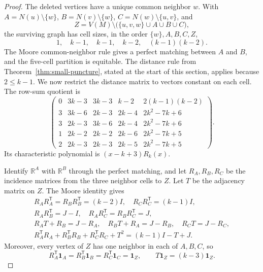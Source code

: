 \documentclass[a4paper,10pt,reqno]{amsart}
\theoremstyle{plain}
\theoremstyle{definition}
\theoremstyle{remark}
\newcommand{\one}{\mathbf 1}
\begin{document}
\begin{proof}
The deleted vertices have a unique common neighbor \(w\).  With
\(A=N(u)\setminus\{w\}\), \(B=N(v)\setminus\{w\}\),
\(C=N(w)\setminus\{u,v\}\), and
\[
 Z=V(M)\setminus\bigl(\{u,v,w\}\cup A\cup B\cup C\bigr),
\]
the surviving graph has cell sizes, in the order \(\{w\},A,B,C,Z\),
\[
 1,\quad k-1,\quad k-1,\quad k-2,\quad (k-1)(k-2).
\]
The Moore common-neighbor rule gives a perfect matching between
\(A\) and \(B\), and the five-cell partition is equitable.
The distance rule from Theorem~\ref{thm:small-puncture}, stated at the
start of this section, applies because \(2\le k-1\).
We now restrict the distance matrix to vectors constant on each cell.
The row-sum quotient is
\[
\begin{pmatrix}
0&3k-3&3k-3&k-2&2(k-1)(k-2)\\
3&3k-6&2k-3&2k-4&2k^2-7k+6\\
3&2k-3&3k-6&2k-4&2k^2-7k+6\\
1&2k-2&2k-2&2k-6&2k^2-7k+5\\
2&2k-3&2k-3&2k-5&2k^2-7k+5
\end{pmatrix}.
\]
Its characteristic polynomial is \((x-k+3)R_k(x)\).

Identify \(\mathbb R^A\) with \(\mathbb R^B\) through the perfect matching,
and let \(R_A,R_B,R_C\) be the incidence matrices from the three
neighbor cells to \(Z\).  Let \(T\) be the adjacency matrix on \(Z\).
The Moore identity gives
\[
\begin{gathered}
R_AR_A^{\mathsf T}=R_BR_B^{\mathsf T}=(k-2)I,\quad
R_CR_C^{\mathsf T}=(k-1)I,\\
R_AR_B^{\mathsf T}=J-I,\quad
R_AR_C^{\mathsf T}=R_BR_C^{\mathsf T}=J,\\
R_AT+R_B=J-R_A,\quad
R_BT+R_A=J-R_B,\quad
R_CT=J-R_C,\\
R_A^{\mathsf T}R_A+R_B^{\mathsf T}R_B+R_C^{\mathsf T}R_C+T^2
=(k-1)I-T+J.
\end{gathered}
\]
Moreover, every vertex of \(Z\) has one neighbor in each of \(A,B,C\),
so
\[
 R_A^{\mathsf T}\one_A
 =R_B^{\mathsf T}\one_B
 =R_C^{\mathsf T}\one_C
 =\one_Z,
 \qquad T\one_Z=(k-3)\one_Z.
\]


\end{proof}
\end{document}
